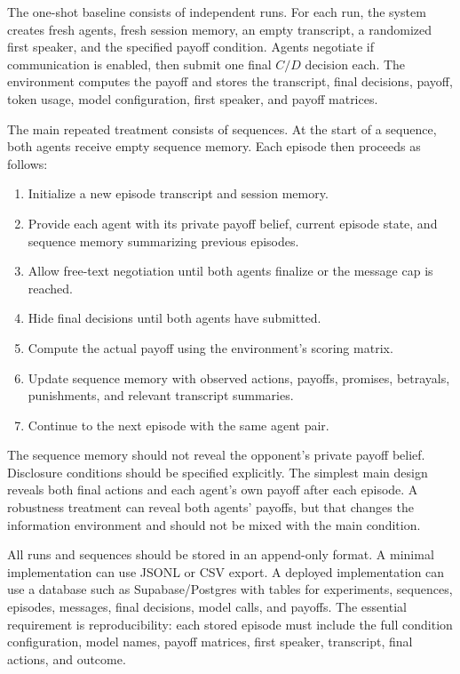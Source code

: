 \documentclass[12pt,a4paper]{article}
\begin{document}
The one-shot baseline consists of independent runs. For each run, the system creates fresh agents, fresh session memory, an empty transcript, a randomized first speaker, and the specified payoff condition. Agents negotiate if communication is enabled, then submit one final $C/D$ decision each. The environment computes the payoff and stores the transcript, final decisions, payoff, token usage, model configuration, first speaker, and payoff matrices.

The main repeated treatment consists of sequences. At the start of a sequence, both agents receive empty sequence memory. Each episode then proceeds as follows:

\begin{enumerate}
  \item Initialize a new episode transcript and session memory.
  \item Provide each agent with its private payoff belief, current episode state, and sequence memory summarizing previous episodes.
  \item Allow free-text negotiation until both agents finalize or the message cap is reached.
  \item Hide final decisions until both agents have submitted.
  \item Compute the actual payoff using the environment's scoring matrix.
  \item Update sequence memory with observed actions, payoffs, promises, betrayals, punishments, and relevant transcript summaries.
  \item Continue to the next episode with the same agent pair.
\end{enumerate}

The sequence memory should not reveal the opponent's private payoff belief. Disclosure conditions should be specified explicitly. The simplest main design reveals both final actions and each agent's own payoff after each episode. A robustness treatment can reveal both agents' payoffs, but that changes the information environment and should not be mixed with the main condition.

All runs and sequences should be stored in an append-only format. A minimal implementation can use JSONL or CSV export. A deployed implementation can use a database such as Supabase/Postgres with tables for experiments, sequences, episodes, messages, final decisions, model calls, and payoffs. The essential requirement is reproducibility: each stored episode must include the full condition configuration, model names, payoff matrices, first speaker, transcript, final actions, and outcome.
\end{document}
